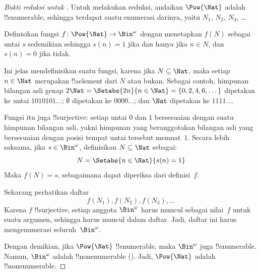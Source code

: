 \documentclass[../../../include/open-logic-section]{subfiles}
\begin{document}
\begin{proof}[Bukti reduksi untuk {}]
Untuk melakukan reduksi, andaikan $\Pow{\Nat}$ adalah !!{enumerable}, sehingga
terdapat suatu enumerasi darinya, yaitu $N_{1}$, $N_{2}$, $N_{3}$, \dots

Definisikan fungsi $f \colon \Pow{\Nat} \to \Bin^\omega$ dengan menetapkan
$f(N)$ sebagai untai $s$ sedemikian sehingga $s(n) = 1$ jika dan hanya jika
$n \in N$, dan $s(n) = 0$ jika tidak.

Ini jelas mendefinisikan suatu fungsi, karena jika $N \subseteq \Nat$, maka
setiap $n \in \Nat$ merupakan !!a{element} dari $N$ atau bukan. Sebagai
contoh, himpunan bilangan asli genap $2\Nat = \Setabs{2n}{n \in \Nat} =
\{0,2, 4, 6, \dots\}$ dipetakan ke untai $1010101\dots$; $\emptyset$ dipetakan
ke $0000\dots$; dan $\Nat$ dipetakan ke $1111\dots$.

Fungsi itu juga !!{surjective}: setiap untai $0$ dan $1$ bersesuaian dengan
suatu himpunan bilangan asli, yakni himpunan yang beranggotakan bilangan asli
yang bersesuaian dengan posisi tempat untai tersebut memuat~$1$. Secara lebih
saksama, jika $s \in \Bin^\omega$, definisikan $N \subseteq \Nat$ sebagai:
\[
N = \Setabs{n \in \Nat}{s(n) = 1}
\]
Maka $f(N) = s$, sebagaimana dapat diperiksa dari definisi~$f$.

Sekarang perhatikan daftar
\[
f(N_1), f(N_2), f(N_3), \dots
\]
Karena $f$ !!{surjective}, setiap anggota $\Bin^\omega$ harus muncul sebagai
nilai~$f$ untuk suatu argumen, sehingga harus muncul dalam daftar. Jadi,
daftar ini harus mengenumerasi seluruh~$\Bin^\omega$.

Dengan demikian, jika $\Pow{\Nat}$ !!{enumerable}, maka $\Bin^\omega$ juga
!!{enumerable}. Namun, $\Bin^\omega$ adalah !!{nonenumerable}
(). Jadi, $\Pow{\Nat}$ adalah
!!{nonenumerable}.
\end{proof}

\end{document}
